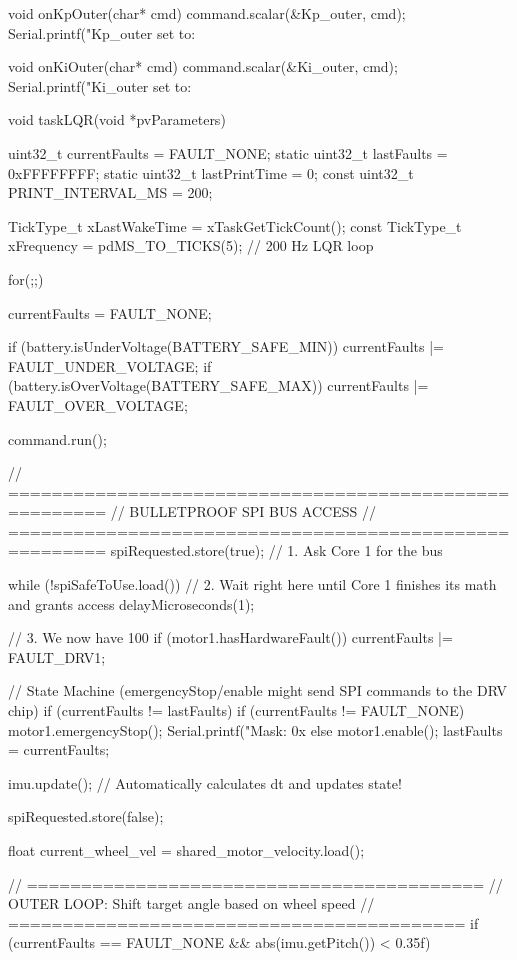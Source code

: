 void onKpOuter(char* cmd) { 
    command.scalar(&Kp_outer, cmd); 
    Serial.printf("Kp_outer set to: %
}

void onKiOuter(char* cmd) { 
    command.scalar(&Ki_outer, cmd); 
    Serial.printf("Ki_outer set to: %
}

void taskLQR(void *pvParameters) {
    uint32_t currentFaults = FAULT_NONE;
    static uint32_t lastFaults = 0xFFFFFFFF; 
    static uint32_t lastPrintTime = 0;
    const uint32_t PRINT_INTERVAL_MS = 200; 

    TickType_t xLastWakeTime = xTaskGetTickCount();
    const TickType_t xFrequency = pdMS_TO_TICKS(5); // 200 Hz LQR loop

    for(;;) {
        currentFaults = FAULT_NONE; 

        if (battery.isUnderVoltage(BATTERY_SAFE_MIN)) currentFaults |= FAULT_UNDER_VOLTAGE;
        if (battery.isOverVoltage(BATTERY_SAFE_MAX))  currentFaults |= FAULT_OVER_VOLTAGE;

        command.run();

        // =======================================================
        // BULLETPROOF SPI BUS ACCESS
        // =======================================================
        spiRequested.store(true); // 1. Ask Core 1 for the bus
        
        while (!spiSafeToUse.load()) { 
            // 2. Wait right here until Core 1 finishes its math and grants access
            delayMicroseconds(1); 
        }

        // 3. We now have 100%
        if (motor1.hasHardwareFault()) currentFaults |= FAULT_DRV1;

        
        // State Machine (emergencyStop/enable might send SPI commands to the DRV chip)
        if (currentFaults != lastFaults) {
            if (currentFaults != FAULT_NONE) {
                motor1.emergencyStop();
                Serial.printf(" Mask: 0x%
            } else {
                motor1.enable();
            }
            lastFaults = currentFaults;
        }

        imu.update(); // Automatically calculates dt and updates state!

        spiRequested.store(false);
        
        float current_wheel_vel = shared_motor_velocity.load();
        
        // ==========================================
        // OUTER LOOP: Shift target angle based on wheel speed
        // ==========================================
        if (currentFaults == FAULT_NONE && abs(imu.getPitch()) < 0.35f) {
            
}}}
